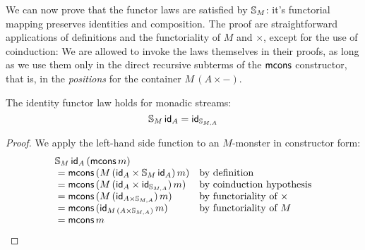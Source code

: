 
We can now prove that the functor laws are satisfied by $$: it's functorial mapping preserves identities and composition.
The proof are straightforward applications of definitions and the functoriality of $M$ and $\times$, except for the use of coinduction:
We are allowed to invoke the laws themselves in their proofs, as long as we use them only in the direct recursive subterms of the $\mcons$ constructor, that is, in the {\em positions} for the container $M\,(A\times -)$.

\begin{lemma}\label{lemma:functor_id}
The identity functor law holds for monadic streams:
$$
\mathbb{S}_{M}\,\mathsf{id}_A = \mathsf{id}_{\mathbb{S}_{M,A}}
$$
\end{lemma}
\begin{proof}
We apply the left-hand side function to an $M$-monster in constructor form:
$$
\begin{array}{ll}
\mathbb{S}_{M}\,\mathsf{id}_A\,(\mathsf{mcons}\,m)\\
{}= \mathsf{mcons}\,(M\,(\mathsf{id}_A\times \mathbb{S}_{M}\,\mathsf{id}_A)\,m)
  & \mbox{by definition}\\
{}= \mathsf{mcons}\,(M\,(\mathsf{id}_A\times \mathsf{id}_{\mathbb{S}_{M,A}})\,m)
  & \mbox{by coinduction hypothesis}\\
{}= \mathsf{mcons}\,(M\,(\mathsf{id}_{A\times \mathbb{S}_{M,A}})\,m)
  & \mbox{by functoriality of }\times\\
{}= \mathsf{mcons}\,(\mathsf{id}_{M\,(A\times \mathbb{S}_{M,A})}\,m)
  & \mbox{by functoriality of }M\\
{}= \mathsf{mcons}\,m
\end{array}
$$
\end{proof}

